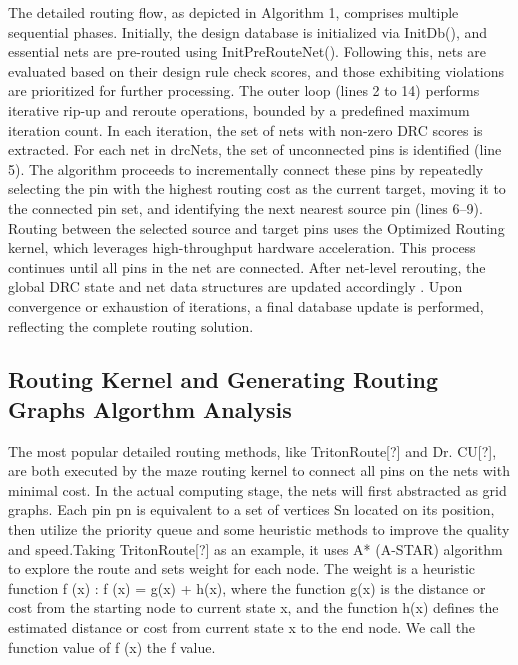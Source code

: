 The detailed routing flow, as depicted in Algorithm 1, comprises multiple sequential phases. Initially, the design database is initialized via InitDb(), and essential nets are pre-routed using InitPreRouteNet(). Following this, nets are evaluated based on their design rule check scores, and those exhibiting violations are prioritized for further processing.
The outer loop (lines 2 to 14) performs iterative rip-up and reroute operations, bounded by a predefined maximum iteration count. In each iteration, the set of nets with non-zero DRC scores is extracted. For each net in drcNets, the set of unconnected pins is identified (line 5). The algorithm proceeds to incrementally connect these pins by repeatedly selecting the pin with the highest routing cost as the current target, moving it to the connected pin set, and identifying the next nearest source pin (lines 6–9).
Routing between the selected source and target pins uses the Optimized Routing kernel, which leverages high-throughput hardware acceleration. This process continues until all pins in the net are connected. After net-level rerouting, the global DRC state and net data structures are updated accordingly . Upon convergence or exhaustion of iterations, a final database update is performed, reflecting the complete routing solution.


\subsection{Routing Kernel and Generating Routing Graphs Algorthm Analysis}
The most popular detailed routing methods, like TritonRoute[?] and Dr. CU[?], are both executed by the maze routing kernel to connect all pins on the nets with minimal cost. 
In the actual computing stage, the nets will first abstracted as grid graphs. Each pin pn is equivalent to a set of vertices Sn located on its position, 
then utilize the priority queue and some heuristic methods to improve the quality and speed.Taking TritonRoute[?] as an example, it uses A* (A-STAR) algorithm to explore the route and sets weight for each node.
The weight is a heuristic function f (x) : f (x) = g(x) + h(x), where the function g(x) is the distance or cost from the starting node to current state x, and the function h(x) defines the estimated distance or cost from current state x to the end node. 
We call the function value of f (x) the f value. 


